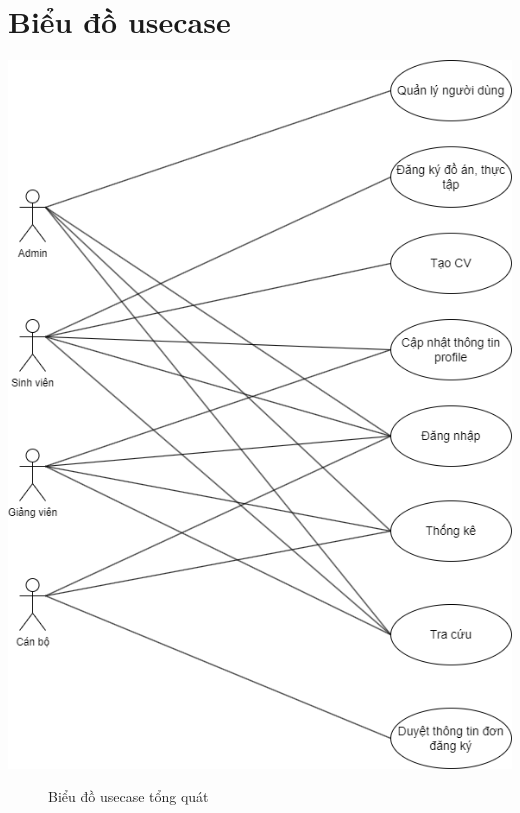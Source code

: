  \section{Biểu đồ usecase}
    \begin{center}
      \includegraphics[width=.9\textwidth]{../drawio/usecasee1.png}
      \begin{figure}[h]
        \centering
        \caption{Biểu đồ usecase tổng quát}
      \end{figure}
    \end{center}
